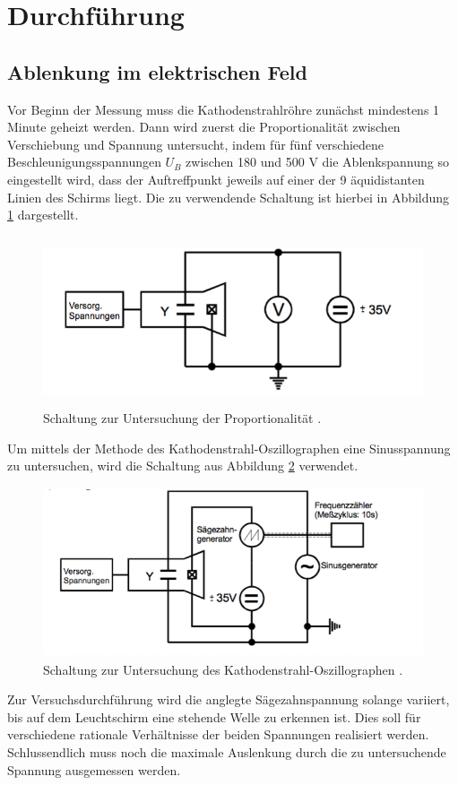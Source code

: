 \section{Durchführung}
\subsection{Ablenkung im elektrischen Feld}

\label{sec:Durchführung}
Vor Beginn der Messung muss die Kathodenstrahlröhre zunächst mindestens 1 Minute
geheizt werden.
Dann wird zuerst die Proportionalität zwischen Verschiebung und Spannung untersucht, indem
für fünf verschiedene Beschleunigungsspannungen $U_B$ zwischen 180 und 500 $\si{\volt}$
die Ablenkspannung so eingestellt wird, dass der Auftreffpunkt jeweils auf einer der
9 äquidistanten Linien des Schirms liegt. Die zu verwendende Schaltung ist hierbei
in Abbildung \ref{fig:schalt1} dargestellt.
\begin{figure}[H]
  \centering
  \includegraphics[height=5cm]{Schaltung1.png}
  \caption{Schaltung zur Untersuchung der Proportionalität \cite{skript1}.}
  \label{fig:schalt1}
\end{figure}
Um mittels der Methode des Kathodenstrahl-Oszillographen eine Sinusspannung
zu untersuchen, wird die Schaltung aus Abbildung \ref{fig:schalt2} verwendet.
\begin{figure}[H]
  \centering
  \includegraphics[height=5cm]{Schaltung2.png}
  \caption{Schaltung zur Untersuchung des Kathodenstrahl-Oszillographen \cite{skript1}.}
  \label{fig:schalt2}
\end{figure}
Zur Versuchsdurchführung wird die anglegte Sägezahnspannung solange variiert, bis
auf dem Leuchtschirm eine stehende Welle zu erkennen ist. Dies soll für verschiedene rationale
Verhältnisse der beiden Spannungen realisiert werden. Schlussendlich muss noch die maximale
Auslenkung durch die zu untersuchende Spannung ausgemessen werden.

